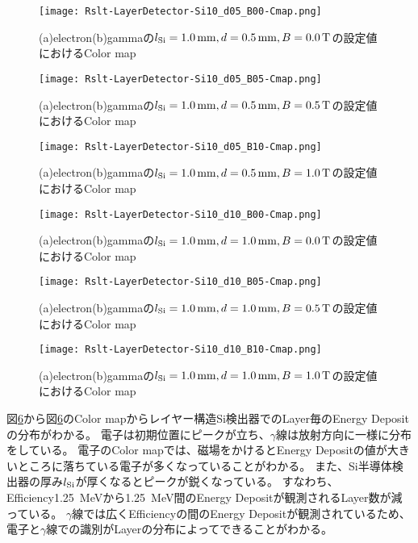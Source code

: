 \documentclass[a4paper,10pt]{jreport}
\begin{document}
\begin{figure}[H]
	\center
	\texttt{[image: Rslt-LayerDetector-Si10\_d05\_B00-Cmap.png]}
	\caption{(a)electron(b)gammaの$l_{\rm{Si}}=\SI{1.0}{mm}, d=\SI{0.5}{mm}, B=\SI{0.0}{T}$の設定値におけるColor map}
	\label{Rslt-LayerDetector-Si10_d05_B00-Cmap}
\end{figure}

\begin{figure}[H]
	\center
	\texttt{[image: Rslt-LayerDetector-Si10\_d05\_B05-Cmap.png]}
	\caption{(a)electron(b)gammaの$l_{\rm{Si}}=\SI{1.0}{mm}, d=\SI{0.5}{mm}, B=\SI{0.5}{T}$の設定値におけるColor map}
	\label{Rslt-LayerDetector-Si10_d05_B05-Cmap}
\end{figure}

\begin{figure}[H]
	\center
	\texttt{[image: Rslt-LayerDetector-Si10\_d05\_B10-Cmap.png]}
	\caption{(a)electron(b)gammaの$l_{\rm{Si}}=\SI{1.0}{mm}, d=\SI{0.5}{mm}, B=\SI{1.0}{T}$の設定値におけるColor map}
	\label{Rslt-LayerDetector-Si10_d05_B10-Cmap}
\end{figure}

\begin{figure}[H]
	\center
	\texttt{[image: Rslt-LayerDetector-Si10\_d10\_B00-Cmap.png]}
	\caption{(a)electron(b)gammaの$l_{\rm{Si}}=\SI{1.0}{mm}, d=\SI{1.0}{mm}, B=\SI{0.0}{T}$の設定値におけるColor map}
	\label{Rslt-LayerDetector-Si10_d10_B00-Cmap}
\end{figure}

\begin{figure}[H]
	\center
	\texttt{[image: Rslt-LayerDetector-Si10\_d10\_B05-Cmap.png]}
	\caption{(a)electron(b)gammaの$l_{\rm{Si}}=\SI{1.0}{mm}, d=\SI{1.0}{mm}, B=\SI{0.5}{T}$の設定値におけるColor map}
	\label{Rslt-LayerDetector-Si10_d10_B05-Cmap}
\end{figure}

\begin{figure}[H]
	\center
	\texttt{[image: Rslt-LayerDetector-Si10\_d10\_B10-Cmap.png]}
	\caption{(a)electron(b)gammaの$l_{\rm{Si}}=\SI{1.0}{mm}, d=\SI{1.0}{mm}, B=\SI{1.0}{T}$の設定値におけるColor map}
	\label{Rslt-LayerDetector-Si05_d05_B00-Cmap}
\end{figure}

図\ref{Rslt-LayerDetector-Si05_d05_B00-Cmap}から図\ref{Rslt-LayerDetector-Si05_d05_B00-Cmap}のColor mapからレイヤー構造Si検出器でのLayer毎のEnergy Depositの分布がわかる。
電子は初期位置にピークが立ち、$\gamma$線は放射方向に一様に分布をしている。
電子のColor mapでは、磁場をかけるとEnergy Depositの値が大きいところに落ちている電子が多くなっていることがわかる。
また、Si半導体検出器の厚み$l_{\rm{Si}}$が厚くなるとピークが鋭くなっている。
すなわち、Efficiency\SI{1.25}{MeV}から\SI{1.25}{MeV}間のEnergy Depositが観測されるLayer数が減っている。
$\gamma$線では広くEfficiencyの間のEnergy Depositが観測されているため、電子と$\gamma$線での識別がLayerの分布によってできることがわかる。
\end{document}
